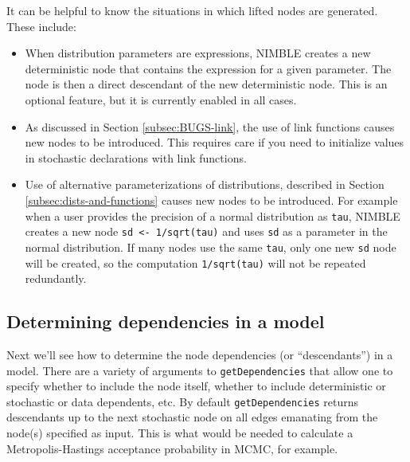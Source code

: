 \documentclass[12pt,oneside]{book}\usepackage[]{graphicx}\usepackage[]{color}
\def\cd#1{\texttt{#1}}
\begin{document}
It can be helpful to know the situations in which lifted nodes are
generated.  These include:

\begin{itemize}
\item When distribution parameters are expressions, NIMBLE
  creates a new deterministic node that contains the expression for a
  given parameter. The node is then a direct descendant of the new
  deterministic node.  This is an optional feature, but it is
  currently enabled in all cases.
\item As discussed in Section \ref{subsec:BUGS-link}, the use of link
  functions causes new nodes to be introduced. This requires care if
  you need to initialize values in stochastic declarations with link functions.
\item Use of alternative parameterizations of distributions, described in Section \ref{subsec:dists-and-functions} causes new nodes to be introduced. For
  example when a user provides the precision of a normal distribution
  as \cd{tau}, NIMBLE creates a new node \cd{sd <- 1/sqrt(tau)} and
  uses \cd{sd} as a parameter in the normal distribution.  If many
  nodes use the same \cd{tau}, only one new \cd{sd} node will be
  created, so the computation \cd{1/sqrt(tau)} will not be repeated
  redundantly.    
\end{itemize}


\subsection{Determining dependencies in a model}
\label{sec:cdgetdependencies}

Next we'll see how to determine the node dependencies (or
``descendants'') in a model. There are a variety of arguments to \cd{getDependencies} that
allow one to specify whether to include the node itself, whether to
include deterministic or stochastic or data dependents, etc. By
default \cd{getDependencies} returns descendants up to the next
stochastic node on all edges emanating from the node(s) specified as input.  This is what would be
needed to calculate a Metropolis-Hastings acceptance probability in
MCMC, for example.
\end{document}
